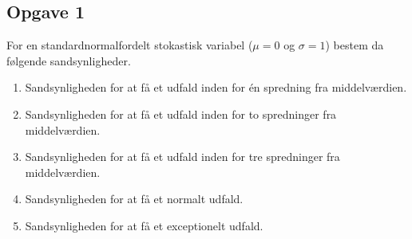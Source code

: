 \subsection*{Opgave 1}

For en standardnormalfordelt stokastisk variabel ($\mu = 0$ og $\sigma = 1$) bestem da følgende sandsynligheder.

\begin{enumerate}[label=\roman*)]
	\item Sandsynligheden for at få et udfald inden for én spredning fra middelværdien.
	\item Sandsynligheden for at få et udfald inden for to spredninger fra middelværdien.
	\item Sandsynligheden for at få et udfald inden for tre spredninger fra middelværdien.
	\item Sandsynligheden for at få et normalt udfald.
	\item Sandsynligheden for at få et exceptionelt udfald.
\end{enumerate}



